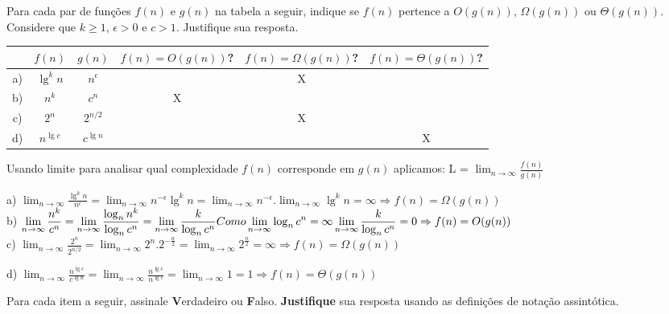 \documentclass[a4paper]{exam}
\begin{document}
\begin{questions}
  \question Para cada par de funções $f(n)$ e $g(n)$ na tabela a
  seguir, indique se $f(n)$ pertence a $O(g(n))$, $\Omega(g(n))$
  ou $\Theta(g(n))$. Considere que $k \geq 1$, $\epsilon > 0$ e
  $c > 1$. Justifique sua resposta.
  \begin{center}
    \begin{tabular}{|c|c|c|c|c|c|}
      \hline
      & $f(n)$ & $g(n)$ & $f(n) = O(g(n))$? & $f(n) = \Omega(g(n))$? & $f(n) = \Theta(g(n))$? \\
      \hline
      a) & $\lg^k n$  &  $n^{\epsilon}$   & & X & \\ \hline
      b) & $n^k$      &  $c^n$          & X & & \\ \hline
      c) & $2^n$      &  $2^{n/2}$       & & X & \\ \hline
      d) & $n^{\lg c}$ &  $c^{\lg n}$      & & & X \\ \hline
    \end{tabular}
  \end{center}
  \begin{solution}
    Usando limite para analisar qual complexidade $f(n)$ corresponde em $g(n)$ aplicamos: 
    L =  $\displaystyle\lim_{n\to\infty} \frac{f(n)}{g(n)}$

    a) $\displaystyle\lim_{n\to\infty} \frac{\lg^k n}{n^{\epsilon}} = \displaystyle\lim_{n\to\infty} n^{-\epsilon}\lg^k n
      = \displaystyle\lim_{n\to\infty} n^{-\epsilon} . \displaystyle\lim_{n\to\infty} \lg^k n 
      = \infty \Rightarrow f(n) = \Omega(g(n))$ \\

    b) $\displaystyle\lim_{n\to\infty} \frac{n^k}{c^n} = \displaystyle\lim_{n\to\infty} \frac{\log_n n^k}{\log_n c^n}
      = \displaystyle\lim_{n\to\infty} \frac{k}{\log_n c^n} \\ \\
      Como \displaystyle\lim_{n\to\infty} \log_n c^n = \infty \\
       \\\displaystyle\lim_{n\to\infty} \frac{k}{\log_n c^n} = 0 \Rightarrow f(n) = O(g(n))$ \\

    c) $\displaystyle\lim_{n\to\infty} \frac{2^n}{2^{n/2}} = \displaystyle\lim_{n\to\infty} 2^n.{2^{-\frac{n}{2}}}
      = \displaystyle\lim_{n\to\infty} 2^{\frac{n}{2}} = \infty \Rightarrow f(n) = \Omega(g(n))$

    d) $\displaystyle\lim_{n\to\infty} \frac{n^{\lg c}}{c^{\lg n}} = \displaystyle\lim_{n\to\infty} \frac{n^{\lg c}}{n^{\lg c}}
      = \displaystyle\lim_{n\to\infty} 1 = 1 \Rightarrow f(n) = \Theta(g(n))$
  \end{solution}
  \question Para cada item a seguir, assinale \textbf{V}erdadeiro 
  ou \textbf{F}also. \textbf{Justifique} sua resposta usando as 
  definições de notação assintótica.
  \begin{parts}

\end{parts}
\end{questions}
\end{document}
